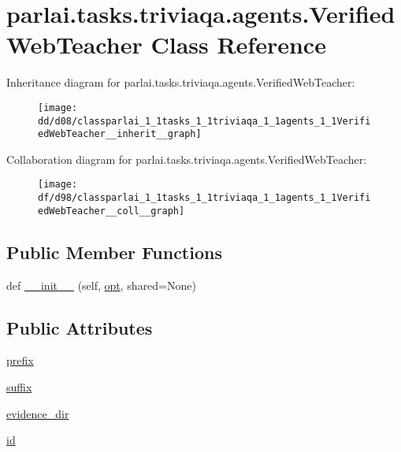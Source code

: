 \hypertarget{classparlai_1_1tasks_1_1triviaqa_1_1agents_1_1VerifiedWebTeacher}{}\section{parlai.\+tasks.\+triviaqa.\+agents.\+Verified\+Web\+Teacher Class Reference}
\label{classparlai_1_1tasks_1_1triviaqa_1_1agents_1_1VerifiedWebTeacher}


Inheritance diagram for parlai.\+tasks.\+triviaqa.\+agents.\+Verified\+Web\+Teacher\+:
\nopagebreak
\begin{figure}[H]
\begin{center}
\leavevmode
\texttt{[image: dd/d08/classparlai\_1\_1tasks\_1\_1triviaqa\_1\_1agents\_1\_1VerifiedWebTeacher\_\_inherit\_\_graph]}
\end{center}
\end{figure}


Collaboration diagram for parlai.\+tasks.\+triviaqa.\+agents.\+Verified\+Web\+Teacher\+:
\nopagebreak
\begin{figure}[H]
\begin{center}
\leavevmode
\texttt{[image: df/d98/classparlai\_1\_1tasks\_1\_1triviaqa\_1\_1agents\_1\_1VerifiedWebTeacher\_\_coll\_\_graph]}
\end{center}
\end{figure}
\subsection*{Public Member Functions}
\begin{DoxyCompactItemize}
\item 
def \hyperlink{classparlai_1_1tasks_1_1triviaqa_1_1agents_1_1VerifiedWebTeacher_a24150c529859f238cecd45835b93111a}{\+\_\+\+\_\+init\+\_\+\+\_\+} (self, \hyperlink{classparlai_1_1core_1_1agents_1_1Teacher_a3ce6243860ce978a897922863ed32fa4}{opt}, shared=None)
\end{DoxyCompactItemize}
\subsection*{Public Attributes}
\begin{DoxyCompactItemize}
\item 
\hyperlink{classparlai_1_1tasks_1_1triviaqa_1_1agents_1_1VerifiedWebTeacher_a87ba370cc7703d6d0674576f12bd374d}{prefix}
\item 
\hyperlink{classparlai_1_1tasks_1_1triviaqa_1_1agents_1_1VerifiedWebTeacher_a664ec91ac0757abaaf6853ea939232e4}{suffix}
\item 
\hyperlink{classparlai_1_1tasks_1_1triviaqa_1_1agents_1_1VerifiedWebTeacher_a6c7349009918dcbbfc17f930458e8698}{evidence\+\_\+dir}
\item 
\hyperlink{classparlai_1_1tasks_1_1triviaqa_1_1agents_1_1VerifiedWebTeacher_a482a09c00640e0bc928c2f8f9b1e20a1}{id}
\end{DoxyCompactItemize}
